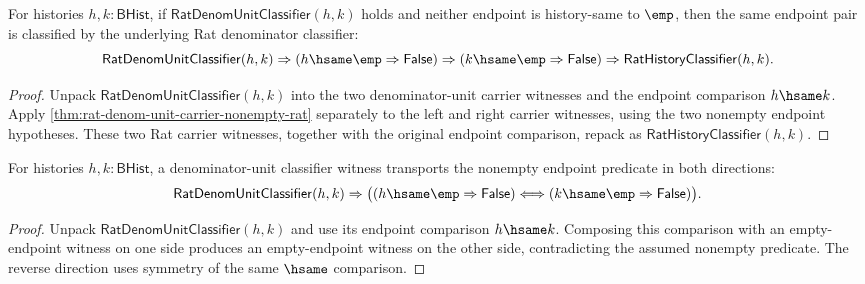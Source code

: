\begin{theorem}
\label{thm:rat-denom-unit-classifier-nonempty-rat-classifier}
For histories $h,k:\mathsf{BHist}$, if
$\mathsf{RatDenomUnitClassifier}(h,k)$ holds and neither endpoint is
history-same to $\emp$, then the same endpoint pair is classified by the
underlying Rat denominator classifier:
$$
\mathsf{RatDenomUnitClassifier}(h,k)\Rightarrow
(h\hsame\emp\Rightarrow\mathsf{False})\Rightarrow
(k\hsame\emp\Rightarrow\mathsf{False})\Rightarrow
\mathsf{RatHistoryClassifier}(h,k).
$$
\end{theorem}
\begin{proof}
Unpack $\mathsf{RatDenomUnitClassifier}(h,k)$ into the two denominator-unit
carrier witnesses and the endpoint comparison $h\hsame k$. Apply
\autoref{thm:rat-denom-unit-carrier-nonempty-rat} separately to the left and
right carrier witnesses, using the two nonempty endpoint hypotheses. These two
Rat carrier witnesses, together with the original endpoint comparison, repack
as $\mathsf{RatHistoryClassifier}(h,k)$.
\end{proof}

\begin{theorem}
\label{thm:rat-denom-unit-classifier-nonempty-endpoint-iff}
For histories $h,k:\mathsf{BHist}$, a denominator-unit classifier witness
transports the nonempty endpoint predicate in both directions:
$$
\mathsf{RatDenomUnitClassifier}(h,k)\Rightarrow
\bigl((h\hsame\emp\Rightarrow\mathsf{False})
\Longleftrightarrow
(k\hsame\emp\Rightarrow\mathsf{False})\bigr).
$$
\end{theorem}
\begin{proof}
Unpack $\mathsf{RatDenomUnitClassifier}(h,k)$ and use its endpoint comparison
$h\hsame k$. Composing this comparison with an empty-endpoint witness on one
side produces an empty-endpoint witness on the other side, contradicting the
assumed nonempty predicate. The reverse direction uses symmetry of the same
$\hsame$ comparison.
\end{proof}

